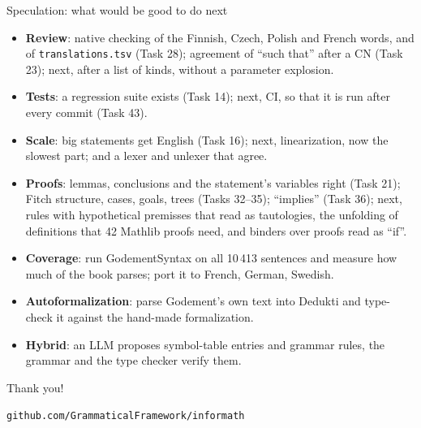 \documentclass[10pt,aspectratio=169]{beamer}
\newcommand{\ok}[1]{\textcolor{good}{#1}}
\begin{document}
\begin{frame}{Speculation: what would be good to do next}
  \begin{itemize}\small
    \item \textbf{Review}: native checking of the Finnish, Czech, Polish and French
          words, and of \texttt{translations.tsv} (Task 28); agreement of ``such that'' \ok{after a CN (Task 23)}; next, after a
          list of kinds, without a parameter explosion.
    \item \textbf{Tests}: \ok{a regression suite exists (Task 14)}; next, CI, so that it
          is run after every commit (Task 43).
    \item \textbf{Scale}: \ok{big statements get English (Task 16)}; next,
          linearization, now the slowest part; and a lexer and unlexer that agree.
    \item \textbf{Proofs}: \ok{lemmas, conclusions and the statement's variables right
          (Task 21); Fitch structure, cases, goals, trees (Tasks 32--35); ``implies'' (Task
          36)}; next, rules with hypothetical premisses that read as tautologies, the unfolding
          of definitions that 42 Mathlib proofs need, and binders over proofs read as ``if''.
    \item \textbf{Coverage}: run GodementSyntax on all 10\,413 sentences and measure
          how much of the book parses; port it to French, German, Swedish.
    \item \textbf{Autoformalization}: parse Godement's own text into Dedukti and
          type-check it against the hand-made formalization.
    \item \textbf{Hybrid}: an LLM proposes symbol-table entries and grammar rules,
          the grammar and the type checker verify them.
  \end{itemize}
\end{frame}

\begin{frame}[standout]
  Thank you!

  \vspace{1em}
  \normalsize
  \texttt{github.com/GrammaticalFramework/informath}
\end{frame}
\end{document}
